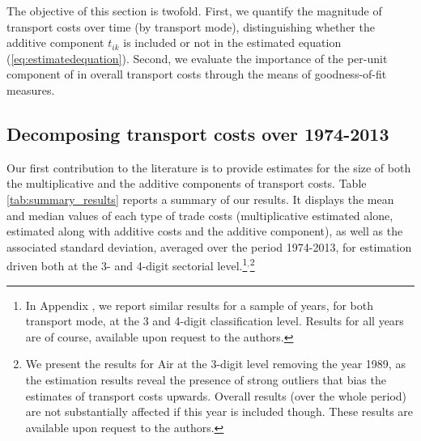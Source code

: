 \documentclass[a4paper,11pt]{article}
\begin{document}
The objective of this section is twofold. First, we quantify the magnitude of transport costs over time (by transport mode), distinguishing whether the additive component $t_{ik}$ is included or not in the estimated equation (\ref{eq:estimatedequation}). Second, we evaluate the importance of the per-unit component of in overall transport costs through the means of goodness-of-fit measures.


\subsection{Decomposing transport costs over 1974-2013}

Our first contribution to the literature is to provide estimates for the size of both the multiplicative and the additive components of transport costs. Table \ref{tab:summary_results} reports a summary of our results. It displays the mean and median values of each type of trade costs (multiplicative estimated alone, estimated along with additive costs and the additive component), as well as the associated standard deviation, averaged over the period 1974-2013, for estimation driven both at the 3- and 4-digit sectorial level.\footnote{In Appendix , we report similar results for a sample of years, for both transport mode, at the 3 and 4-digit classification level. Results for all years are of course, available upon request to the authors.}$^{,}$\footnote{We present the results for Air at the 3-digit level removing the year 1989, as the estimation results reveal the presence of strong outliers that bias the estimates of transport costs upwards. Overall results (over the whole period) are not substantially affected if this year is included though. These results are available upon request to the authors.}
\end{document}
